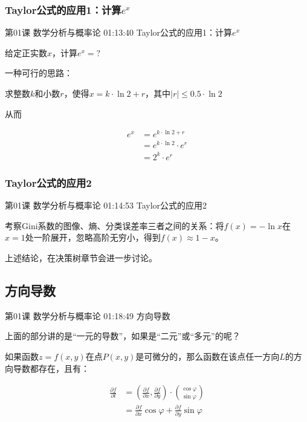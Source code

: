\documentclass[UTF8]{ctexart}
\begin{document}
\subsubsection{Taylor公式的应用1：计算$e^{x}$}

第01课 数学分析与概率论 01:13:40 Taylor公式的应用1：计算$e^{x}$

给定正实数$x$，计算$e^{x}=?$

一种可行的思路：

求整数$k$和小数$r$，使得$x=k \cdot \ln 2 + r$，其中$|r| \leq 0.5 \cdot \ln 2$

从而

\begin{equation}
\begin{aligned}
e^{x} &= e^{k \cdot \ln 2 + r} \\
&=e^{k \cdot \ln 2} \cdot e^{r} \\
&=2^{k} \cdot e^{r}
\end{aligned}
\end{equation}

\subsubsection{Taylor公式的应用2}

第01课 数学分析与概率论 01:14:53 Taylor公式的应用2

考察Gini系数的图像、熵、分类误差率三者之间的关系：将$f(x)=-\ln x$在$x=1$处一阶展开，忽略高阶无穷小，得到$f(x) \approx 1-x$。

上述结论，在决策树章节会进一步讨论。

\subsection{方向导数}

第01课 数学分析与概率论 01:18:49 方向导数

上面的部分讲的是“一元的导数”，如果是“二元”或“多元”的呢？

如果函数$z=f(x,y)$在点$P(x,y)$是可微分的，那么函数在该点任一方向$L$的方向导数都存在，且有：

\begin{equation}
\begin{aligned}
\frac{\partial f}{\partial l}
&= \left ( \frac{\partial f}{\partial x},\frac{\partial f}{\partial y}  \right ) \cdot \binom{\cos \varphi}{\sin \varphi} \\
&=\frac{\partial f}{\partial x} \cos \varphi + \frac{\partial f}{\partial y} \sin \varphi
\end{aligned}
\end{equation}
\end{document}
